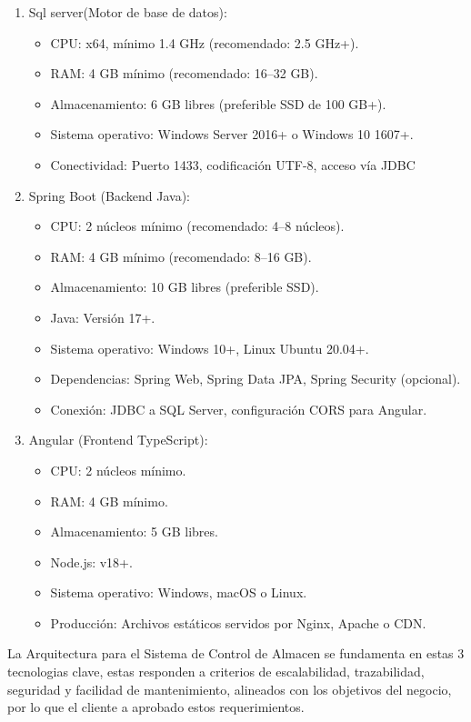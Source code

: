 \documentclass[12pt]{article} %
\begin{document}
  \begin{enumerate}
  \item Sql server(Motor de base de datos):
  \begin{itemize}
    \item CPU: x64, mínimo 1.4 GHz (recomendado: 2.5 GHz+).
    \item RAM: 4 GB mínimo (recomendado: 16–32 GB).
    \item Almacenamiento: 6 GB libres (preferible SSD de 100 GB+).
    \item Sistema operativo: Windows Server 2016+ o Windows 10 1607+.
    \item Conectividad: Puerto 1433, codificación UTF-8, acceso vía JDBC
  \end{itemize}
  \item Spring Boot (Backend Java):
  \begin{itemize}
    \item CPU: 2 núcleos mínimo (recomendado: 4–8 núcleos).
    \item RAM: 4 GB mínimo (recomendado: 8–16 GB).
    \item Almacenamiento: 10 GB libres (preferible SSD).
    \item Java: Versión 17+.
    \item Sistema operativo: Windows 10+, Linux Ubuntu 20.04+.
    \item Dependencias: Spring Web, Spring Data JPA, Spring Security (opcional).
    \item Conexión: JDBC a SQL Server, configuración CORS para Angular.
  \end{itemize}
  \item Angular (Frontend TypeScript):
  \begin{itemize}
    \item CPU: 2 núcleos mínimo.
    \item RAM: 4 GB mínimo.
    \item Almacenamiento: 5 GB libres.
    \item Node.js: v18+.
    \item Sistema operativo: Windows, macOS o Linux.
    \item Producción: Archivos estáticos servidos por Nginx, Apache o CDN.
  \end{itemize}
\end{enumerate}

La Arquitectura para el Sistema de Control de Almacen se fundamenta en estas 3 tecnologias clave, estas responden a criterios de escalabilidad, trazabilidad, seguridad y facilidad de mantenimiento, alineados con los objetivos del negocio, por lo que el cliente a aprobado estos requerimientos.
\end{document}
